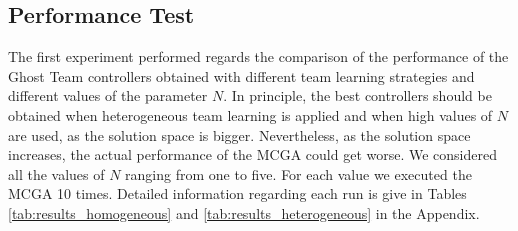 \documentclass[journal]{IEEEtran}
\begin{document}
\subsection{Performance Test}
The first experiment performed regards the comparison of the performance of the Ghost Team controllers obtained with different team learning strategies and different values of the parameter $N$. In principle, the best controllers should be obtained when heterogeneous team learning is applied and when high values of $N$ are used, as the solution space is bigger. Nevertheless, as the solution space increases, the actual performance of the MCGA could get worse. We considered all the values of $N$ ranging from one to five. For each value we executed the MCGA 10 times. Detailed information regarding each run is give in Tables \ref{tab:results_homogeneous} and \ref{tab:results_heterogeneous} in the Appendix.

\begin{table} [!t]
\caption{Performance of the controllers for the Ghost Team obtained by the GA using different numbers of neighborhoods.}
\label{tab:summary}
\centering
{}
\hfil
{}
\end{table}
\end{document}
